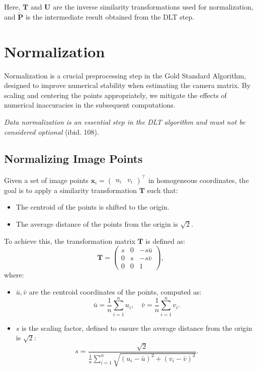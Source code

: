 \documentclass[12pt]{article}
\begin{document}
Here, \( \mathbf{T} \) and \( \mathbf{U} \) are the inverse similarity transformations used for normalization, and \( \tilde{\mathbf{P}} \) is the intermediate result obtained from the DLT step.

\section{Normalization}

Normalization is a crucial preprocessing step in the Gold Standard Algorithm, designed to improve numerical stability when estimating the camera matrix. By scaling and centering the points appropriately, we mitigate the effects of numerical inaccuracies in the subsequent computations.

\textit{Data normalization is an essential step in the DLT algorithm and must not be considered optional} (ibid. 108).

\subsection{Normalizing Image Points}
Given a set of image points \( \mathbf{x}_i = \begin{pmatrix} u_i & v_i \end{pmatrix}^\top \) in homogeneous coordinates, the goal is to apply a similarity transformation \( \mathbf{T} \) such that:
\begin{itemize}
    \item The centroid of the points is shifted to the origin.
    \item The average distance of the points from the origin is \(\sqrt{2}\).
\end{itemize}

To achieve this, the transformation matrix \( \mathbf{T} \) is defined as:
$$
\mathbf{T} = 
\begin{pmatrix} 
s & 0 & -s \bar{u} \\
0 & s & -s \bar{v} \\
0 & 0 & 1 
\end{pmatrix},
$$
where:
\begin{itemize}
    \item \( \bar{u}, \bar{v} \) are the centroid coordinates of the points, computed as:
    $$
    \bar{u} = \frac{1}{n} \sum_{i=1}^n u_i, \quad \bar{v} = \frac{1}{n} \sum_{i=1}^n v_i.
    $$
    \item \( s \) is the scaling factor, defined to ensure the average distance from the origin is \(\sqrt{2}\):
    $$
    s = \frac{\sqrt{2}}{\displaystyle\frac{1}{n} \sum_{i=1}^n \sqrt{(u_i - \bar{u})^2 + (v_i - \bar{v})^2}}.
    $$
\end{itemize}
\end{document}
